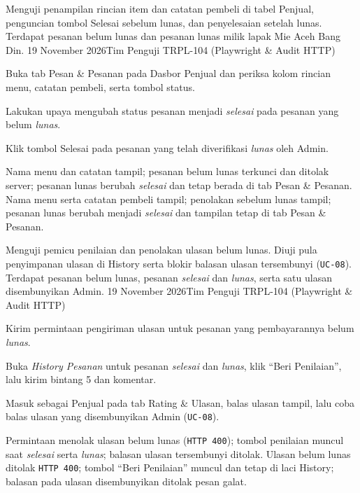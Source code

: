 {Menguji penampilan rincian item dan catatan pembeli di tabel Penjual, penguncian tombol Selesai sebelum lunas, dan penyelesaian setelah lunas.}
{Terdapat pesanan belum lunas dan pesanan lunas milik lapak Mie Aceh Bang Din.}
{19 November 2026}{Tim Penguji TRPL-104 (Playwright \& Audit HTTP)}
{\begin{uclist}
  \item Buka tab Pesan \& Pesanan pada Dasbor Penjual dan periksa kolom rincian menu, catatan pembeli, serta tombol status.
  \item Lakukan upaya mengubah status pesanan menjadi \textit{selesai} pada pesanan yang belum \textit{lunas}.
  \item Klik tombol Selesai pada pesanan yang telah diverifikasi \textit{lunas} oleh Admin.
\end{uclist}}
{Nama menu dan catatan tampil; pesanan belum lunas terkunci dan ditolak server; pesanan lunas berubah \textit{selesai} dan tetap berada di tab Pesan \& Pesanan.}
{Nama menu serta catatan pembeli tampil; penolakan sebelum lunas tampil; pesanan lunas berubah menjadi \textit{selesai} dan tampilan tetap di tab Pesan \& Pesanan.}

{Menguji pemicu penilaian dan penolakan ulasan belum lunas. Diuji pula penyimpanan ulasan di History serta blokir balasan ulasan tersembunyi (\texttt{UC-08}).}
{Terdapat pesanan belum lunas, pesanan \textit{selesai} dan \textit{lunas}, serta satu ulasan disembunyikan Admin.}
{19 November 2026}{Tim Penguji TRPL-104 (Playwright \& Audit HTTP)}
{\begin{uclist}
  \item Kirim permintaan pengiriman ulasan untuk pesanan yang pembayarannya belum \textit{lunas}.
  \item Buka \textit{History Pesanan} untuk pesanan \textit{selesai} dan \textit{lunas}, klik ``Beri Penilaian'', lalu kirim bintang 5 dan komentar.
  \item Masuk sebagai Penjual pada tab Rating \& Ulasan, balas ulasan tampil, lalu coba balas ulasan yang disembunyikan Admin (\texttt{UC-08}).
\end{uclist}}
{Permintaan menolak ulasan belum lunas (\texttt{HTTP 400}); tombol penilaian muncul saat \textit{selesai} serta \textit{lunas}; balasan ulasan tersembunyi ditolak.}
{Ulasan belum lunas ditolak \texttt{HTTP 400}; tombol ``Beri Penilaian'' muncul dan tetap di laci History; balasan pada ulasan disembunyikan ditolak pesan galat.}

